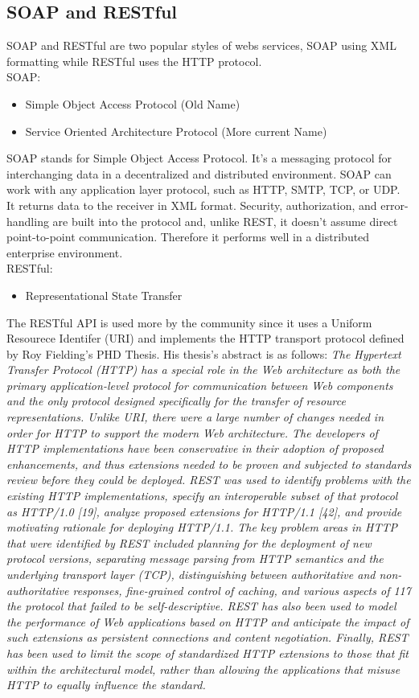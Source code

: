 \documentclass[a4paper, 11pt]{article}
\begin{document}
    \subsection{SOAP and RESTful}
        SOAP and RESTful are two popular styles of webs services, SOAP using XML formatting while RESTful uses the HTTP protocol.\\
        SOAP:
        \begin{itemize}
            \item Simple Object Access Protocol (Old Name)
            \item Service Oriented Architecture Protocol (More current Name)
        \end{itemize}
        SOAP stands for Simple Object Access Protocol. It’s a messaging protocol for interchanging data in a decentralized and distributed environment. SOAP can work with any application layer protocol, such as HTTP, SMTP, TCP, or UDP. It returns data to the receiver in XML format. Security, authorization, and error-handling are built into the protocol and, unlike REST, it doesn’t assume direct point-to-point communication. Therefore it performs well in a distributed enterprise environment.\\
        RESTful:
        \begin{itemize}
            \item Representational State Transfer
        \end{itemize}
        The RESTful API is used more by the community since it uses a Uniform Resourece Identifer (URI) and  implements the HTTP transport protocol defined by Roy Fielding's PHD Thesis.  His thesis's abstract is as follows:
        \newpage\newpage
        \textit{The Hypertext Transfer Protocol (HTTP) has a special role in the Web architecture as both the primary application-level protocol for communication between Web components and the only protocol designed specifically for the transfer of resource representations. Unlike URI, there were a large number of changes needed in order for HTTP to support the modern Web architecture. The developers of HTTP implementations have been conservative in their adoption of proposed enhancements, and thus extensions needed to be proven and subjected to standards review before they could be deployed. REST was used to identify problems with the existing HTTP implementations, specify an interoperable subset of that protocol as HTTP/1.0 [19], analyze proposed extensions for HTTP/1.1 [42], and provide motivating rationale for deploying HTTP/1.1. The key problem areas in HTTP that were identified by REST included planning for the deployment of new protocol versions, separating message parsing from HTTP semantics and the underlying transport layer (TCP), distinguishing between authoritative and non-authoritative responses, fine-grained control of caching, and various aspects of 117 the protocol that failed to be self-descriptive. REST has also been used to model the performance of Web applications based on HTTP and anticipate the impact of such extensions as persistent connections and content negotiation. Finally, REST has been used to limit the scope of standardized HTTP extensions to those that fit within the architectural model, rather than allowing the applications that misuse HTTP to equally influence the standard.}
\end{document}
